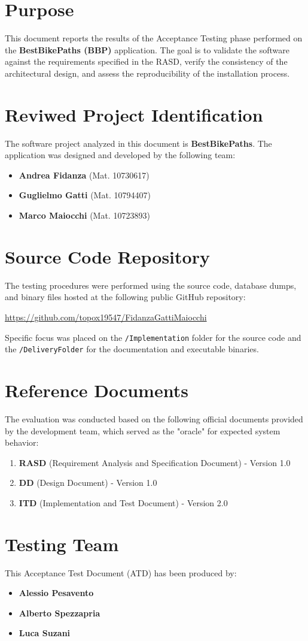 \section{Purpose}
This document reports the results of the Acceptance Testing phase performed on the \textbf{BestBikePaths (BBP)} application. The goal is to validate the software against the requirements specified in the RASD, verify the consistency of the architectural design, and assess the reproducibility of the installation process.

\section{Reviwed Project Identification}
The software project analyzed in this document is \textbf{BestBikePaths}.
The application was designed and developed by the following team:

\begin{itemize}
    \item \textbf{Andrea Fidanza} (Mat. 10730617)
    \item \textbf{Guglielmo Gatti} (Mat. 10794407)
    \item \textbf{Marco Maiocchi} (Mat. 10723893)
\end{itemize}

\section{Source Code Repository}
The testing procedures were performed using the source code, database dumps, and binary files hosted at the following public GitHub repository:

\begin{center}
    \url{https://github.com/topox19547/FidanzaGattiMaiocchi}
\end{center}

Specific focus was placed on the \texttt{/Implementation} folder for the source code and the \texttt{/DeliveryFolder} for the documentation and executable binaries.

\section{Reference Documents}
The evaluation was conducted based on the following official documents provided by the development team, which served as the "oracle" for expected system behavior:

\begin{enumerate}
    \item \textbf{RASD} (Requirement Analysis and Specification Document) - Version 1.0
    \item \textbf{DD} (Design Document) - Version 1.0
    \item \textbf{ITD} (Implementation and Test Document) - Version 2.0
\end{enumerate}

\section{Testing Team}
This Acceptance Test Document (ATD) has been produced by:

\begin{itemize}
    \item \textbf{Alessio Pesavento}
    \item \textbf{Alberto Spezzapria}
    \item \textbf{Luca Suzani}
\end{itemize}